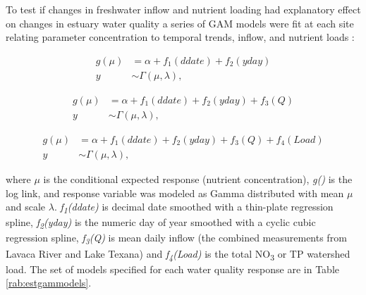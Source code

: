 \documentclass[water,article,submit,oneauthor]{Definitions/mdpi}
\begin{document}
To test if changes in freshwater inflow and nutrient loading had
explanatory effect on changes in estuary water quality a series of GAM
models were fit at each site relating parameter concentration to
temporal trends, inflow, and nutrient loads
\citep{murphyNutrientImprovementsChesapeake2022}:

\begin{equation}\label{eq:5}
\begin{aligned}
g(\mu) &= \alpha + f_1(ddate) + f_2(yday) \\
y &\sim \Gamma(\mu,\lambda),
\end{aligned}
\end{equation}

\begin{equation}\label{eq:6}
\begin{aligned}
g(\mu) &= \alpha + f_1(ddate) + f_2(yday) + f_3(Q) \\
y &\sim \Gamma(\mu,\lambda),
\end{aligned}
\end{equation}

\begin{equation}\label{eq:7}
\begin{aligned}
g(\mu) &= \alpha + f_1(ddate) + f_2(yday) + f_3(Q) + f_4(Load) \\
y &\sim \Gamma(\mu,\lambda),
\end{aligned}
\end{equation}

where \(\mu\) is the conditional expected response (nutrient
concentration), \emph{g()} is the log link, and response variable was
modeled as Gamma distributed with mean \(\mu\) and scale \(\lambda\).
\emph{f\textsubscript{1}(ddate)} is decimal date smoothed with a
thin-plate regression spline, \emph{f\textsubscript{2}(yday)} is the
numeric day of year smoothed with a cyclic cubic regression spline,
\emph{f\textsubscript{3}(Q)} is mean daily inflow (the combined
measurements from Lavaca River and Lake Texana) and
\emph{f\textsubscript{4}(Load)} is the total NO\textsubscript{3} or TP
watershed load. The set of models specified for each water quality
response are in Table \ref{rab:estgammodels}.
\end{document}
